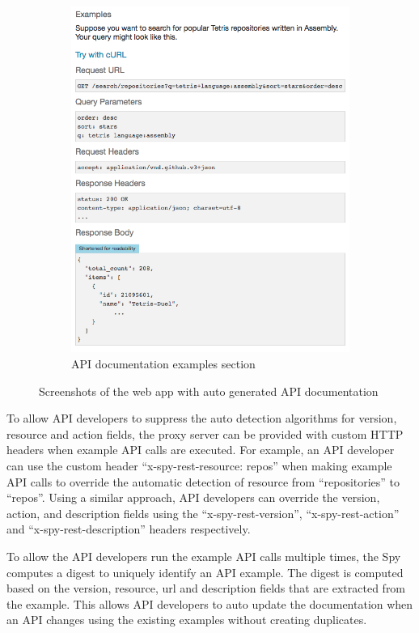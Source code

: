 \documentclass[conference]{IEEEtran}
\begin{document}
\begin{figure}[!tbh]
\begin{subfigure}[t]{0.5\textwidth}
    \includegraphics[width=\linewidth]{spyrest_examples.png}
    \caption{API documentation examples section}
    \label{fig:examples}
  \end{subfigure}
  \caption{Screenshots of the web app with auto generated API documentation}
  \label{fig:spyrest_screenshots}
\end{figure}

To allow API developers to suppress the auto detection algorithms for version, resource and action fields, the proxy server can be provided with custom HTTP headers when example API calls are executed. For example, an API developer can use the custom header ``x-spy-rest-resource: repos'' when making example API calls to override the automatic detection of resource from ``repositories'' to ``repos''. Using a similar approach, API developers can override the version, action, and description fields using the ``x-spy-rest-version'', ``x-spy-rest-action'' and ``x-spy-rest-description'' headers respectively.

To allow the API developers run the example API calls multiple times, the Spy computes a digest to uniquely identify an API example. The digest is computed based on the version, resource, url and description fields that are extracted from the example. This allows API developers to auto update the documentation when an API changes using the existing examples without creating duplicates.
\end{document}
